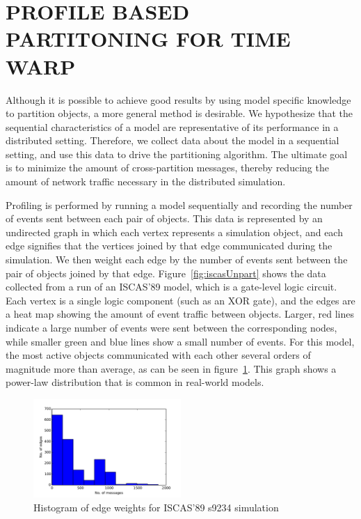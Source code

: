 \documentclass{wscpaperproc}
\begin{document}
\section{PROFILE BASED PARTITONING FOR TIME WARP}\label{sec:partitioning}

Although it is possible to achieve good results by using model specific knowledge to partition objects, a more general method is desirable. We hypothesize that the sequential characteristics of a model are representative of its performance in a distributed setting. Therefore, we collect data about the model in a sequential setting, and use this data to drive the partitioning algorithm. The ultimate goal is to minimize the amount of cross-partition messages, thereby reducing the amount of network traffic necessary in the distributed simulation. 

Profiling is performed by running a model sequentially and recording the number of events sent between each pair of objects. This data is represented by an undirected graph in which each vertex represents a simulation object, and each edge signifies that the vertices joined by that edge communicated during the simulation. We then weight each edge by the number of events sent between the pair of objects joined by that edge. Figure~\ref{fig:iscasUnpart} shows the data collected from a run of an ISCAS’89 model, which is a gate-level logic circuit. Each vertex is a single logic component (such as an XOR gate), and the edges are a heat map showing the amount of event traffic between objects. Larger, red lines indicate a large number of events were sent between the corresponding nodes, while smaller green and blue lines show a small number of events. For this model, the most active objects communicated with each other several orders of magnitude more than average, as can be seen in figure~\ref{fig:s9234_histo}. This graph shows a power-law distribution that is common in real-world models. 

\begin{figure}[h]
\centering
\includegraphics[clip=true,width=0.5\textwidth]{s9234_histo}
\caption{Histogram of edge weights for ISCAS'89 s9234 simulation}
\label{fig:s9234_histo}
\end{figure}
\end{document}
